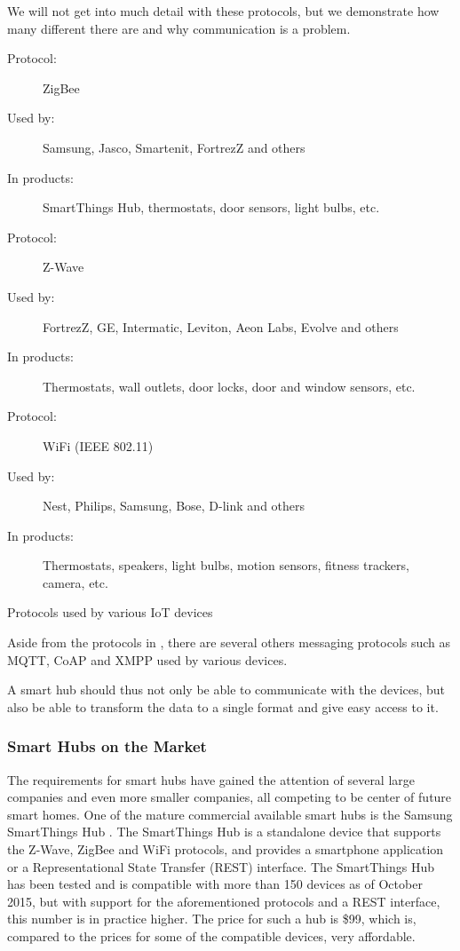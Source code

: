 We will not get into much detail with these protocols, 
but we demonstrate how many different there are and why communication is a problem.
\begin{table}
   \begin{description}
       \item[Protocol:] ZigBee
       \item[Used by:] Samsung, Jasco, Smartenit, FortrezZ and others
       \item[In products:] SmartThings Hub, thermostats, door sensors, light bulbs, etc.\\
       
       \item[Protocol:] Z-Wave
       \item[Used by:] FortrezZ, GE, Intermatic, Leviton, Aeon Labs, Evolve and others
       \item[In products:] Thermostats, wall outlets, door locks, door and window sensors, etc.  \\
       
       \item[Protocol:] WiFi (IEEE 802.11)
       \item[Used by:] Nest, Philips, Samsung, Bose, D-link and others
       \item[In products:] Thermostats, speakers, light bulbs, motion sensors, fitness trackers, camera, etc. 
    \end{description}
    \caption{Protocols used by various IoT devices}\label{table:iotprotocols}
\end{table}

Aside from the protocols in , 
there are several others messaging protocols such as MQTT, CoAP and XMPP used by various devices. 

A smart hub should thus not only be able to communicate with the devices, 
but also be able to transform the data to a single format and give easy access to it. 

\subsubsection{Smart Hubs on the Market}
The requirements for smart hubs have gained the attention of several large companies and even more smaller companies, 
all competing to be center of future smart homes. 
One of the mature commercial available smart hubs is the Samsung SmartThings Hub \cite{SMARTTHINGS}. 
The SmartThings Hub is a standalone device that supports the Z-Wave, ZigBee and WiFi protocols, 
and provides a smartphone application or a Representational State Transfer (REST) interface. 
The SmartThings Hub has been tested and is compatible with more than 150 devices as of October 2015,
but with support for the aforementioned protocols and a REST interface, this number is in practice higher.  
The price for such a hub is \$99, which is, compared to the prices for some of the compatible devices, very affordable. 

